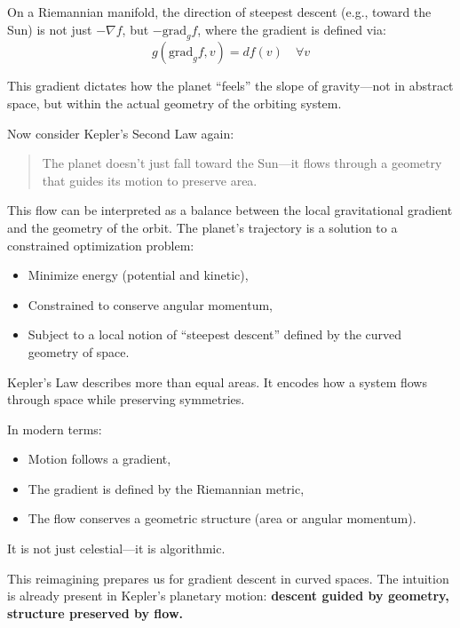 On a Riemannian manifold, the direction of steepest descent (e.g., toward the Sun) is not just \( -\nabla f \), but \( -\text{grad}_g f \), where the gradient is defined via:
\[
g(\text{grad}_g f, v) = df(v) \quad \forall v
\]

This gradient dictates how the planet “feels” the slope of gravity—not in abstract space, but within the actual geometry of the orbiting system.

Now consider Kepler’s Second Law again:

\begin{quote}
The planet doesn’t just fall toward the Sun—it flows through a geometry that guides its motion to preserve area.
\end{quote}

This flow can be interpreted as a balance between the local gravitational gradient and the geometry of the orbit. The planet’s trajectory is a solution to a constrained optimization problem:
\begin{itemize}
  \item Minimize energy (potential and kinetic),
  \item Constrained to conserve angular momentum,
  \item Subject to a local notion of “steepest descent” defined by the curved geometry of space.
\end{itemize}

\begin{tcolorbox}[colback=blue!5!white, colframe=blue!50!black,
title={Kepler’s Second Law as Gradient-Constrained Motion}]
Kepler’s Law describes more than equal areas.  
It encodes how a system flows through space while preserving symmetries.

In modern terms:
\begin{itemize}
  \item Motion follows a gradient,
  \item The gradient is defined by the Riemannian metric,
  \item The flow conserves a geometric structure (area or angular momentum).
\end{itemize}

It is not just celestial—it is algorithmic.
\end{tcolorbox}

This reimagining prepares us for gradient descent in curved spaces. The intuition is already present in Kepler’s planetary motion:  
\textbf{descent guided by geometry, structure preserved by flow.}
